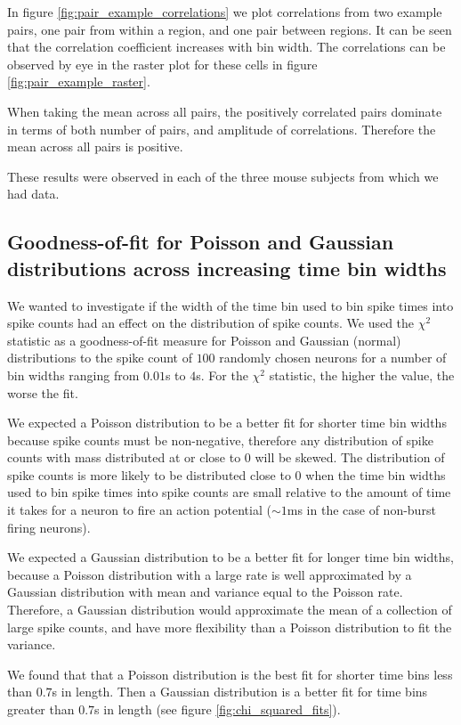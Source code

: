     In figure \ref{fig:pair_example_correlations} we plot correlations from two example pairs, one pair from within a region, and one pair between regions. It can be seen that the correlation coefficient increases with bin width. The correlations can be observed by eye in the raster plot for these cells in figure \ref{fig:pair_example_raster}.

    When taking the mean across all pairs, the positively correlated pairs dominate in terms of both number of pairs, and amplitude of correlations. Therefore the mean across all pairs is positive.

    These results were observed in each of the three mouse subjects from which we had data.

    \subsection{Goodness-of-fit for Poisson and Gaussian distributions across increasing time bin widths}
    We wanted to investigate if the width of the time bin used to bin spike times into spike counts had an effect on the distribution of spike counts.  We used the $\chi^2$ statistic as a goodness-of-fit measure for Poisson and Gaussian (normal) distributions to the spike count of $100$ randomly chosen neurons for a number of bin widths ranging from $0.01$s to $4$s. For the $\chi^2$ statistic, the higher the value, the worse the fit.

    We expected a Poisson distribution to be a better fit for shorter time bin widths because spike counts must be non-negative, therefore any distribution of spike counts with mass distributed at or close to $0$ will be skewed. The distribution of spike counts is more likely to be distributed close to $0$ when the time bin widths used to bin spike times into spike counts are small relative to the amount of time it takes for a neuron to fire an action potential ($\sim 1$ms in the case of non-burst firing neurons).

    We expected a Gaussian distribution to be a better fit for longer time bin widths, because a Poisson distribution with a large rate is well approximated by a Gaussian distribution with mean and variance equal to the Poisson rate. Therefore, a Gaussian distribution would approximate the mean of a collection of large spike counts, and have more flexibility than a Poisson distribution to fit the variance.

    We found that that a Poisson distribution is the best fit for shorter time bins less than $0.7$s in length. Then a Gaussian distribution is a better fit for time bins greater than $0.7$s in length (see figure \ref{fig:chi_squared_fits}).

